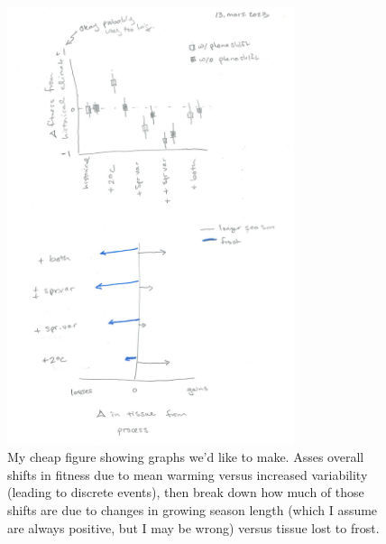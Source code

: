\documentclass[11pt,letter]{article}
\begin{document}
\vspace{-1ex}
\begin{figure}
  \begin{center}
\includegraphics[width=0.75\textwidth]{figures/2023Mar13Notes.jpg}
  \end{center}
  \caption{My cheap figure showing graphs we'd like to make. Asses overall shifts in fitness due to mean warming versus increased variability (leading to discrete events), then break down how much of those shifts are due to changes in growing season length (which I assume are always positive, but I may be wrong) versus tissue lost to frost.}
\label{fig}
\end{figure}
\vspace{-1ex}
\end{document}
